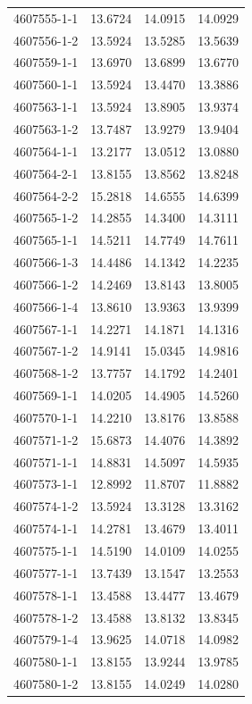 \begin{longtable}{lrrr}
4607555-1-1 & 13.6724 & 14.0915 & 14.0929 \\
4607556-1-2 & 13.5924 & 13.5285 & 13.5639 \\
4607559-1-1 & 13.6970 & 13.6899 & 13.6770 \\
4607560-1-1 & 13.5924 & 13.4470 & 13.3886 \\
4607563-1-1 & 13.5924 & 13.8905 & 13.9374 \\
4607563-1-2 & 13.7487 & 13.9279 & 13.9404 \\
4607564-1-1 & 13.2177 & 13.0512 & 13.0880 \\
4607564-2-1 & 13.8155 & 13.8562 & 13.8248 \\
4607564-2-2 & 15.2818 & 14.6555 & 14.6399 \\
4607565-1-2 & 14.2855 & 14.3400 & 14.3111 \\
4607565-1-1 & 14.5211 & 14.7749 & 14.7611 \\
4607566-1-3 & 14.4486 & 14.1342 & 14.2235 \\
4607566-1-2 & 14.2469 & 13.8143 & 13.8005 \\
4607566-1-4 & 13.8610 & 13.9363 & 13.9399 \\
4607567-1-1 & 14.2271 & 14.1871 & 14.1316 \\
4607567-1-2 & 14.9141 & 15.0345 & 14.9816 \\
4607568-1-2 & 13.7757 & 14.1792 & 14.2401 \\
4607569-1-1 & 14.0205 & 14.4905 & 14.5260 \\
4607570-1-1 & 14.2210 & 13.8176 & 13.8588 \\
4607571-1-2 & 15.6873 & 14.4076 & 14.3892 \\
4607571-1-1 & 14.8831 & 14.5097 & 14.5935 \\
4607573-1-1 & 12.8992 & 11.8707 & 11.8882 \\
4607574-1-2 & 13.5924 & 13.3128 & 13.3162 \\
4607574-1-1 & 14.2781 & 13.4679 & 13.4011 \\
4607575-1-1 & 14.5190 & 14.0109 & 14.0255 \\
4607577-1-1 & 13.7439 & 13.1547 & 13.2553 \\
4607578-1-1 & 13.4588 & 13.4477 & 13.4679 \\
4607578-1-2 & 13.4588 & 13.8132 & 13.8345 \\
4607579-1-4 & 13.9625 & 14.0718 & 14.0982 \\
4607580-1-1 & 13.8155 & 13.9244 & 13.9785 \\
4607580-1-2 & 13.8155 & 14.0249 & 14.0280 \\

\end{longtable}
